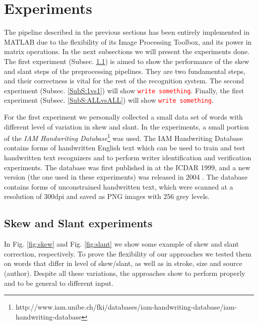\documentclass[conference]{IEEEtran}
\newcommand{\todo}[1]{\textcolor{red}{\texttt{#1}}}
\begin{document}
\section{Experiments} \label{experiments}
The pipeline described in the previous sections has been entirely implemented in MATLAB due to the flexibility of its Image Processing Toolbox, and its power in matrix operations. In the next subsections we will present the experiments done. The first experiment (Subsec. \ref{SubS:SS}) is aimed to show the performance of the skew and slant steps of the preprocessing pipelines. They are two fundamental steps, and their correctness is vital for the rest of the recognition system. The second experiment (Subsec. \ref{SubS:1vs1}) will show \todo{write something}. Finally, the first experiment  (Subsec. \ref{SubS:ALLvsALL})  will show \todo{write something}.

For the first experiment we personally collected a small data set of words with different level of  variation in skew and slant. In the experiments, a small portion of the \textit{IAM Handwriting Database}\footnote{http://www.iam.unibe.ch/fki/databases/iam-handwriting-database/iam-handwriting-database} was used. The IAM Handwriting Database contains forms of handwritten English text which can be used to train and test handwritten text recognizers and to perform writer identification and verification experiments. The database was first published in \cite{FullEnglish} at the ICDAR 1999, and a new version (the one used in these experiments) was released in 2004 \cite{marti02iam}. The database contains forms of unconstrained handwritten text, which were scanned at a resolution of 300dpi and saved as PNG images with 256 grey levels. 

\subsection{Skew and Slant experiments} \label{SubS:SS}
In Fig. \ref{fig:skew} and Fig. \ref{fig:slant} we show some example of skew and slant correction, respectively. To prove the flexibility of our approaches we tested them on words that differ in level of skew/slant, as well as in stroke, size and source (author). Despite all these variations, the approaches show to perform properly and to be general to different input.
\end{document}
